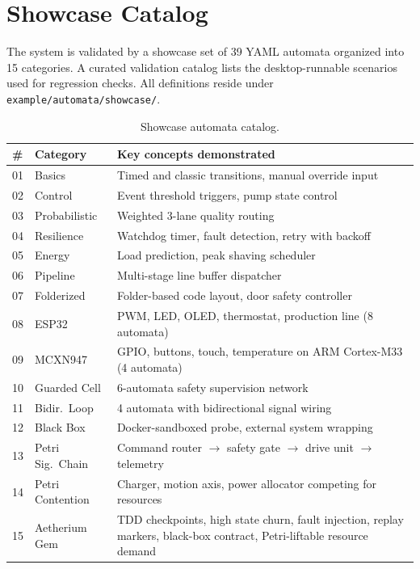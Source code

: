 \chapter{Showcase Catalog}
\label{chap:showcase}

The system is validated by a showcase set of 39 YAML automata organized into 15 categories. A curated validation catalog lists the desktop-runnable scenarios used for regression checks. All definitions reside under \texttt{example/automata/showcase/}.

\begin{table}[!htbp]
  \centering
  \caption{Showcase automata catalog.}
  \label{tab:catalog}
  \vskip6pt
  \begin{tabularx}{\textwidth}{llX}
    \toprule
    \# & Category & Key concepts demonstrated \\
    \midrule
    01 & Basics           & Timed and classic transitions, manual override input \\
    02 & Control          & Event threshold triggers, pump state control \\
    03 & Probabilistic    & Weighted 3-lane quality routing \\
    04 & Resilience       & Watchdog timer, fault detection, retry with backoff \\
    05 & Energy           & Load prediction, peak shaving scheduler \\
    06 & Pipeline         & Multi-stage line buffer dispatcher \\
    07 & Folderized       & Folder-based code layout, door safety controller \\
    08 & ESP32            & PWM, LED, OLED, thermostat, production line (8 automata) \\
    09 & MCXN947          & GPIO, buttons, touch, temperature on ARM Cortex-M33 (4 automata) \\
    10 & Guarded Cell     & 6-automata safety supervision network \\
    11 & Bidir.\ Loop     & 4 automata with bidirectional signal wiring \\
    12 & Black Box        & Docker-sandboxed probe, external system wrapping \\
    13 & Petri Sig.\ Chain & Command router $\to$ safety gate $\to$ drive unit $\to$ telemetry \\
    14 & Petri Contention & Charger, motion axis, power allocator competing for resources \\
    15 & Aetherium Gem    & TDD checkpoints, high state churn, fault injection, replay markers, black-box contract, Petri-liftable resource demand \\
    \bottomrule
  \end{tabularx}
\end{table}

